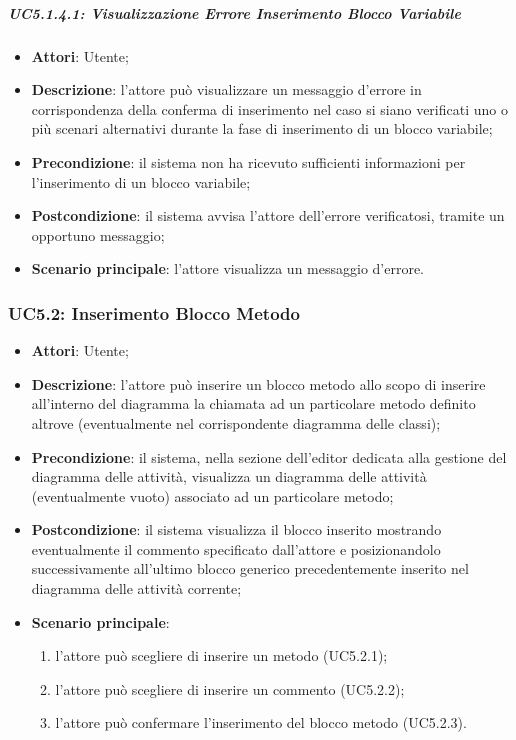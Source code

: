 \subparagraph{UC5.1.4.1: Visualizzazione Errore Inserimento Blocco Variabile}
\label{UC5.1.4.1}
\begin{itemize}
	\item \textbf{Attori}: Utente;
	\item \textbf{Descrizione}: l'attore può visualizzare un messaggio d'errore in corrispondenza della conferma di inserimento nel caso si siano verificati uno o più scenari alternativi durante la fase di inserimento di un blocco variabile;
	\item \textbf{Precondizione}: il sistema non ha ricevuto sufficienti informazioni per l'inserimento di un blocco variabile;
	\item \textbf{Postcondizione}: il sistema avvisa l'attore dell'errore verificatosi, tramite un opportuno messaggio;
	\item \textbf{Scenario principale}: l'attore visualizza un messaggio d'errore.
\end{itemize}

\subsubsection{UC5.2: Inserimento Blocco Metodo}
\label{UC5.2}
\begin{itemize}
	\item \textbf{Attori}: Utente;
	\item \textbf{Descrizione}: l'attore può inserire un blocco metodo allo scopo di inserire all'interno del diagramma la chiamata ad un particolare metodo definito altrove (eventualmente nel corrispondente diagramma delle classi);
	\item \textbf{Precondizione}: il sistema, nella sezione dell'editor dedicata alla gestione del diagramma delle attività, visualizza un diagramma delle attività (eventualmente vuoto) associato ad un particolare metodo;
	\item \textbf{Postcondizione}: il sistema visualizza il blocco inserito mostrando eventualmente il commento specificato dall'attore e posizionandolo successivamente all'ultimo blocco generico precedentemente inserito nel diagramma delle attività corrente;
	\item \textbf{Scenario principale}:
	\begin{enumerate}
		\item l'attore può scegliere di inserire un metodo (UC5.2.1);
		\item l'attore può scegliere di inserire un commento (UC5.2.2);
		\item l'attore può confermare l'inserimento del blocco metodo (UC5.2.3).
	\end{enumerate}
\end{itemize}

